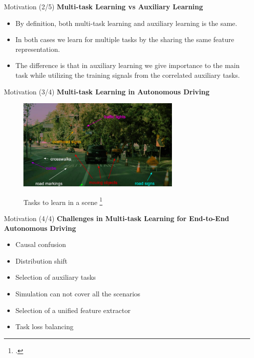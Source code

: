 \documentclass[aspectratio=169]{beamer}
\begin{document}
\begin{frame}{Motivation (2/5)}
  \textbf{Multi-task Learning vs Auxiliary Learning}

  \begin{itemize}
      \item By definition, both multi-task learning and auxiliary learning is the same. 
      \item In both cases we learn for multiple tasks by the sharing the same feature representation.
      \item The difference is that in auxiliary learning we give importance to the main task while utilizing the training signals from the correlated auxiliary tasks. 
  \end{itemize}
   
\end{frame}
\begin{frame}{Motivation (3/4)}
  \textbf{Multi-task Learning in Autonomous Driving}
  \begin{figure}[H]
     \centering
     
\includegraphics[width=0.6\linewidth, height=4.5cm]{images/MTL_aux.png} 
\label{fig:subim1}

\caption{Tasks to learn in a scene \footcite{tesla} }
\label{fig:image2}
\end{figure}
\end{frame}


   
\begin{frame}{Motivation (4/4)}
  \textbf{Challenges in Multi-task Learning for End-to-End Autonomous Driving
}

  \begin{itemize}
      \item Causal confusion
      \item Distribution shift 
      \item Selection of auxiliary tasks
      \item Simulation can not cover all the scenarios 
      \item Selection of a unified feature extractor 
      \item Task loss balancing
  \end{itemize}
\end{frame}
\end{document}
